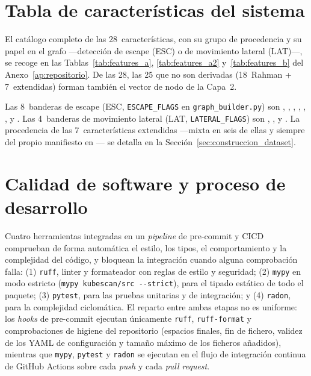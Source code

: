 \section{Tabla de características del sistema}
\label{sec:features_table}

El catálogo completo de las 28~características, con su grupo de procedencia y su
papel en el grafo —detección de escape (ESC) o de movimiento lateral (LAT)\mbox{—,} se
recoge en las Tablas~\ref{tab:features_a}, \ref{tab:features_a2}
y~\ref{tab:features_b} del Anexo~\ref{ap:repositorio}. De las 28, las 25 que no
son derivadas (18~Rahman + 7~extendidas) forman también el vector de nodo de la
Capa~2.

Las 8~banderas de escape (ESC, \texttt{ESCAPE\_FLAGS} en \texttt{graph\_builder.py}) son
, , ,
, , ,
 y . Las 4~banderas de movimiento
lateral (LAT, \texttt{LATERAL\_FLAGS}) son ,
,  y .
La procedencia de las 7~características extendidas —mixta en seis de ellas y
siempre del propio manifiesto en — se detalla en la
Sección~\ref{sec:construccion_dataset}.

\section{Calidad de software y proceso de desarrollo}
\label{sec:calidad}

Cuatro herramientas integradas en un
\textit{pipeline} de pre-commit y \acs{CICD} comprueban de forma automática el
estilo, los tipos, el comportamiento y la complejidad del código, y bloquean la
integración cuando alguna comprobación falla: (1) \texttt{ruff}, linter y
formateador con reglas de estilo y seguridad; (2) \texttt{mypy} en modo estricto
(\texttt{mypy kubescan/src -{}-strict}), para el tipado estático de todo el
paquete; (3) \texttt{pytest}, para las pruebas unitarias y de integración; y
(4) \texttt{radon}, para la complejidad ciclomática. El reparto entre ambas
etapas no es uniforme: los \textit{hooks} de pre-commit ejecutan únicamente
\texttt{ruff}, \texttt{ruff-format} y comprobaciones de higiene del repositorio
(espacios finales, fin de fichero, validez de los \acs{YAML} de configuración y
tamaño máximo de los ficheros añadidos), mientras que \texttt{mypy},
\texttt{pytest} y \texttt{radon} se ejecutan en el flujo de integración continua
de GitHub Actions sobre cada \textit{push} y cada \textit{pull request}.

